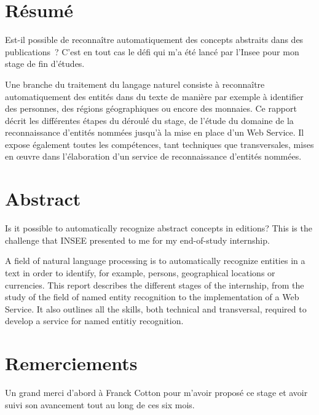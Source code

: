 \documentclass[11pt, oneside, a4paper, titlepage, french]{article}
\begin{document}

\begin{titlepage}

\end{titlepage}

\thispagestyle{empty}
\newpage

\section*{Résumé}
Est-il possible de reconnaître automatiquement des concepts abstraits dans des publications~? C'est en tout cas le défi qui m'a été lancé par l'Insee pour mon stage de fin d'études.
\newline

Une branche du traitement du langage naturel consiste à reconnaître automatiquement des entités dans du texte de manière par exemple à identifier des personnes, des régions géographiques ou encore des monnaies. Ce rapport décrit les différentes étapes du déroulé du stage, de l'étude du domaine de la reconnaissance d'entités nommées jusqu'à la mise en place d'un Web Service. Il expose également toutes les compétences, tant techniques que transversales, mises en œuvre dans l'élaboration d'un service de reconnaissance d'entités nommées.
\newpage

\section*{Abstract}
Is it possible to automatically recognize abstract concepts in editions? This is the challenge that INSEE presented to me for my end-of-study internship.
\newline

A field of natural language processing is to automatically recognize entities in a text in order to identify, for example, persons, geographical locations or currencies. This report describes the different stages of the internship, from the study of the field of named entity recognition to the implementation of a Web Service. It also outlines all the skills, both technical and transversal, required to develop a service for named entitiy recognition.
\newpage

\section*{Remerciements}
Un grand merci d'abord à Franck Cotton pour m'avoir proposé ce stage et avoir suivi son avancement tout au long de ces six mois.
\newline
\end{document}

